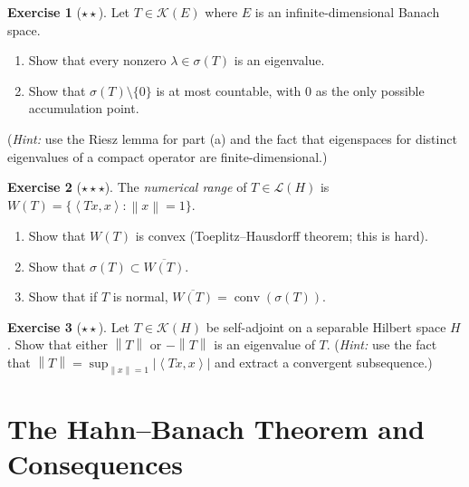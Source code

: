 \documentclass[a4paper,12pt]{book}
\DeclareMathOperator{\conv}{conv}
\newcommand{\norm}[1]{\left\| #1 \right\|}
\newcommand{\abs}[1]{\left| #1 \right|}
\newcommand{\inner}[2]{\left\langle #1, #2 \right\rangle}
\theoremstyle{definition}
\newtheorem{exercise}{Exercise}[chapter]
\theoremstyle{plain}
\theoremstyle{remark}
\begin{document}
\begin{exercise}[$\star\star$]\label{exo:spectrum-compact-op}
Let $T\in\mathcal{K}(E)$ where $E$ is an infinite-dimensional Banach space.
\begin{enumerate}[label=(\alph*)]
  \item Show that every nonzero $\lambda\in\sigma(T)$ is an eigenvalue.
  \item Show that $\sigma(T)\setminus\{0\}$ is at most countable, with $0$ as the
        only possible accumulation point.
\end{enumerate}
(\emph{Hint:} use the Riesz lemma for part (a) and the fact that eigenspaces for
distinct eigenvalues of a compact operator are finite-dimensional.)
\end{exercise}

\begin{exercise}[$\star\star\star$]\label{exo:numerical-range}
The \emph{numerical range} of $T\in\mathcal{L}(H)$ is
$W(T)=\{\inner{Tx}{x}:\norm{x}=1\}$.
\begin{enumerate}[label=(\alph*)]
  \item Show that $W(T)$ is convex (Toeplitz--Hausdorff theorem; this is hard).
  \item Show that $\sigma(T)\subset\overline{W(T)}$.
  \item Show that if $T$ is normal, $\overline{W(T)}=\conv(\sigma(T))$.
\end{enumerate}
\end{exercise}

\begin{exercise}[$\star\star$]\label{exo:compact-selfadj-eigenvalues}
Let $T\in\mathcal{K}(H)$ be self-adjoint on a separable Hilbert space $H$.
Show that either $\norm{T}$ or $-\norm{T}$ is an eigenvalue of $T$.
(\emph{Hint:} use the fact that $\norm{T}=\sup_{\norm{x}=1}\abs{\inner{Tx}{x}}$
and extract a convergent subsequence.)
\end{exercise}


\chapter{The Hahn--Banach Theorem and Consequences}\label{ch:hahn-banach}
\minitoc
\end{document}
